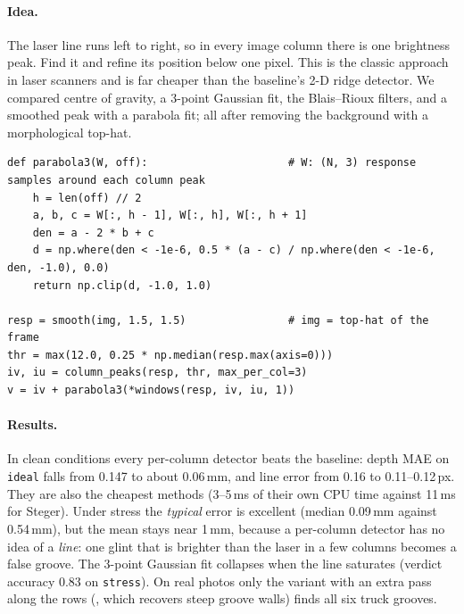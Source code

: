\paragraph{Idea.} The laser line runs left to right, so in every image column there is one brightness peak. Find it
and refine its position below one pixel. This is the classic approach in laser scanners and is far cheaper than the
baseline's 2-D ridge detector. We compared centre of gravity, a 3-point Gaussian fit, the Blais--Rioux filters, and
a smoothed peak with a parabola fit; all after removing the background with a morphological top-hat.

\begin{lstlisting}[caption={Smoothed peak + parabola (\texttt{algos/pk\_fir2d.py}). The parabola through the three samples around the maximum gives the sub-pixel row.}]
def parabola3(W, off):                      # W: (N, 3) response samples around each column peak
    h = len(off) // 2
    a, b, c = W[:, h - 1], W[:, h], W[:, h + 1]
    den = a - 2 * b + c
    d = np.where(den < -1e-6, 0.5 * (a - c) / np.where(den < -1e-6, den, -1.0), 0.0)
    return np.clip(d, -1.0, 1.0)

resp = smooth(img, 1.5, 1.5)                # img = top-hat of the frame
thr = max(12.0, 0.25 * np.median(resp.max(axis=0)))
iv, iu = column_peaks(resp, thr, max_per_col=3)
v = iv + parabola3(*windows(resp, iv, iu, 1))
\end{lstlisting}

\paragraph{Results.} In clean conditions every per-column detector beats the baseline: depth MAE on \texttt{ideal}
falls from 0.147 to about 0.06\,mm, and line error from 0.16 to 0.11--0.12\,px. They are also the cheapest methods
(3--5\,ms of their own CPU time against 11\,ms for Steger). Under stress the \emph{typical} error is excellent
(median 0.09\,mm against 0.54\,mm), but the mean stays near 1\,mm, because a per-column detector has no idea of a
\emph{line}: one glint that is brighter than the laser in a few columns becomes a false groove. The 3-point Gaussian
fit collapses when the line saturates (verdict accuracy 0.83 on \texttt{stress}). On real photos only the variant
with an extra pass along the rows (, which recovers steep groove walls) finds all six truck
grooves.


